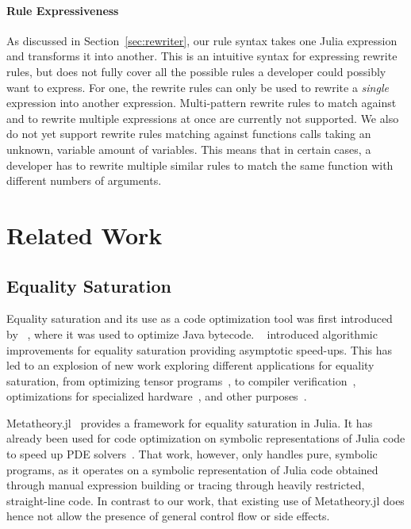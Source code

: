 \paragraph{Rule Expressiveness}
As discussed in Section~\ref{sec:rewriter}, our rule syntax takes one Julia expression and transforms it into another.
This is an intuitive syntax for expressing rewrite rules, but does not fully cover all the possible rules a developer could possibly want to express.
For one, the rewrite rules can only be used to rewrite a \emph{single} expression into another expression.
Multi-pattern rewrite rules to match against and to rewrite multiple expressions at once are currently not supported.
We also do not yet support rewrite rules matching against functions calls taking an unknown, variable amount of variables.
This means that in certain cases, a developer has to rewrite multiple similar rules to match the same function with different numbers of arguments.


\section{Related Work}
\label{sec:related work}
\subsection{Equality Saturation}
Equality saturation and its use as a code optimization tool was first introduced by \citeauthor{tateEqualitySaturationNew2009}~\cite{tateEqualitySaturationNew2009}, where it was used to optimize Java bytecode.
\citeauthor{willseyEggFastExtensible2021}~\cite{willseyEggFastExtensible2021} introduced algorithmic improvements for equality saturation providing asymptotic speed-ups.
This has led to an explosion of new work exploring different applications for equality saturation, from optimizing tensor programs~\cite{wangSPORESSumproductOptimization2020,MLSYS2021_cc427d93,smithPureTensorProgram2021}, to compiler verification~\cite{steppEqualityBasedTranslationValidator2011,kourtaCaviarEgraphBased2022}, optimizations for specialized hardware~\cite{ustunIMpressLargeInteger2022,vanhattumVectorizationDigitalSignal2021,matsumuraSymbolicEmulatorShuffle2023}, and other purposes~\cite{panchekhaAutomaticallyImprovingAccuracy2015,chandrakananandiRewriteRuleInference2021}.

Metatheory.jl~\cite{cheliMetatheoryjlFastElegant2021} provides a framework for equality saturation in Julia.
It has already been used for code optimization on symbolic representations of Julia code to speed up PDE solvers~\cite{gowdaHighperformanceSymbolicnumericsMultiple2022}. That work, however, only handles pure, symbolic programs, as it operates on a symbolic representation of Julia code obtained through manual expression building or tracing through heavily restricted, straight-line code. In contrast to our work, that existing use of Metatheory.jl does hence not allow the presence of general control flow or side effects.

